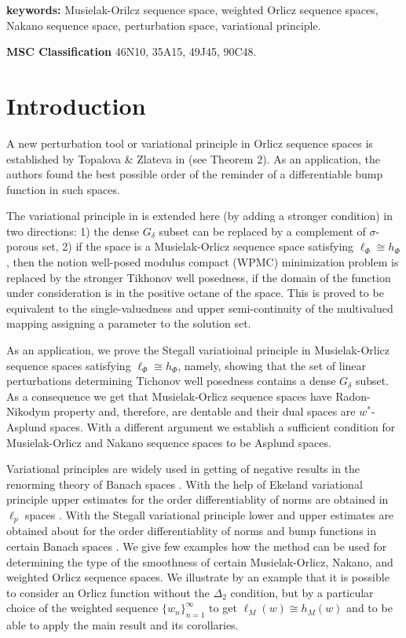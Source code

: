 \documentclass[12pt]{article}
\theoremstyle{thmstyleone}%
\theoremstyle{thmstyletwo}%
\theoremstyle{thmstylethree}%
\begin{document}
{\bf keywords:} Musielak-Orilcz sequence space, weighted Orlicz sequence spaces, Nakano sequence space, perturbation space, variational principle.

{\bf MSC Classification} 46N10, 35A15, 49J45, 90C48.

\section{Introduction}\label{sec1}
{%
A new perturbation tool or variational principle in Orlicz sequence spaces is established by Topalova \& Zlateva in \cite{Topalova-Zlateva} (see Theorem 2). As an application, the authors found the best possible order of the reminder of a differentiable bump function in such spaces.


The variational principle in \cite{Topalova-Zlateva} is extended here (by adding a stronger condition) in two directions: 1) 
the  dense $G_\delta$ subset can be replaced by a complement of $\sigma$-porous set,  2)  if the space 
is a Musielak-Orlicz sequence space satisfying $\ell_\Phi\cong h_{\Phi}$, then the notion well-posed modulus compact (WPMC) minimization problem is replaced by the stronger Tikhonov well posedness, if the domain of the function under consideration is in the positive octane of the space. This is proved to be equivalent to the single-valuedness and upper semi-continuity of the multivalued mapping assigning a parameter to the solution set. 


As an application, we prove the Stegall variatioinal principle in Musielak-Orlicz sequence spaces satisfying 
$\ell_\Phi\cong h_\Phi$, namely, showing that the set of linear perturbations determining Tichonov well posedness contains a dense $G_\delta$ subset. 
As a consequence we get that Musielak-Orlicz sequence spaces have Radon-Nikodym property and, therefore, are dentable and their dual spaces are $w^*$-Asplund spaces. With a different argument we establish a sufficient condition for Musielak-Orlicz and Nakano sequence spaces to be  Asplund spaces.  

Variational principles are widely used in getting of negative results in the renorming theory of Banach spaces \cite{Deville-Godefroy-Zizler}.
With the help of Ekeland variational principle upper estimates for the order differentiablity of norms are 
obtained in $\ell_p$ spaces \cite{Deville-Godefroy-Zizler}.  With the Stegall variational principle lower and upper estimates are obtained about for the order differentiablity of norms and bump functions in certain Banach spaces \cite{Hernandez-Troyanski}.
We give few examples how the method can be used for determining the type of the smoothness of certain Musielak-Orlicz, Nakano, and weighted Orlicz sequence spaces. We illustrate by an example
that it is possible to consider an Orlicz function without the $\Delta_2$ condition, but by a particular choice of the weighted sequence $\{w_n\}_{n=1}^\infty$ to get $\ell_M(w)\cong h_M(w)$ and to be able to apply the main result and its corollaries.

}
\end{document}
